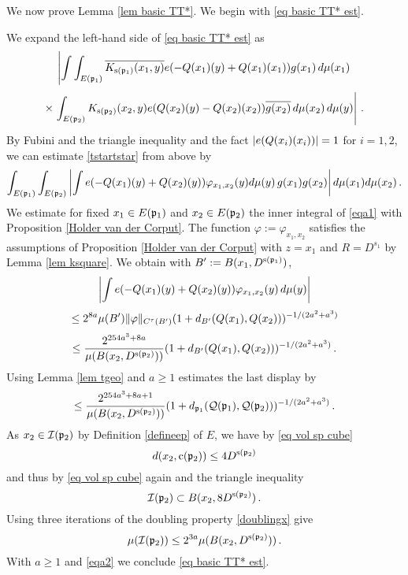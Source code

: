 {We now prove Lemma \ref{lem basic TT*}. We begin with  \eqref{eq basic TT* est}.

We expand the left-hand side of \eqref{eq basic TT* est} as
\begin{equation}\label{tstartstar}
\left|\int \int_{E(\mathfrak p_1)} \overline{K_{\mathrm{s}(\mathfrak p_1)}(x_1,y)}e(-{Q}(x_1)(y)+
    {Q}(x_1)(x_1))g(x_1)\, d\mu(x_1) \right.
\end{equation}
\begin{equation}
 \times \left.\int_{E(\mathfrak p_2)} {K_{\mathrm{s}(\mathfrak p_2)}(x_2,y)}e({Q}(x_2)(y)
    -{Q}(x_2)(x_2))\overline{g(x_2)}\, d\mu(x_2)\, d\mu(y)\right|\, .
\end{equation}
By Fubini and the triangle inequality and
the fact $|e({Q}(x_i)(x_i))|=1$ for $i=1,2$, we can estimate
\eqref{tstartstar} from above by
\begin{equation}\label{eqa1}
    \int_{E(\mathfrak p_1)} \int_{E(\mathfrak p_2)} \left|\int
    e(-{Q}(x_1)(y)+{Q}(x_2)(y))\varphi_{x_1,x_2}(y)
    d\mu(y) \, g(x_1)g(x_2)\right| d\mu(x_1)d\mu(x_2)\,.
\end{equation}
We estimate for fixed $x_1\in E(\mathfrak p_1)$ and
$x_2\in E(\mathfrak p_2)$ the inner integral of \eqref{eqa1} with
Proposition \ref{Holder van der Corput}. The function
$\varphi:=\varphi_{x_1,x_2}$ satisfies the assumptions of
Proposition \ref{Holder van der Corput} with $z = x_1$ and $R = D^{s_1}$ by Lemma \ref{lem ksquare}.
We obtain with $B':= B(x_1, D^{\mathrm{s}(\mathfrak p_1)})$,
\begin{equation}
    \left|\int
    e(-{Q}(x_1)(y)+{Q}(x_2)(y))\varphi_{x_1,x_2}(y)
    \,d\mu(y)\right|
\end{equation}
\begin{equation}
 \le     2^{8a} \mu(B') \|{\varphi}\|_{C^\tau(B')}
       (1 + d_{B'}({Q}(x_1),{Q}(x_2)))^{-1/(2a^2+a^3)}
\end{equation}
\begin{equation}
 \le     \frac{2^{254a^3+8a}}
 {\mu(B(x_2, D^{\mathrm{s}(\mathfrak p_2)}))}
       (1 + d_{B'}({Q}(x_1),{Q}(x_2)))^{-1/(2a^2+a^3)}\,.
\end{equation}
Using Lemma \ref{lem tgeo} and $a\ge 1$ estimates the last display by
\begin{equation}\label{eqa2}
 \le     \frac{2^{254a^3 + 8a + 1}}
 {\mu(B(x_2, D^{\mathrm{s}(\mathfrak p_2)}))}
       (1+d_{\mathfrak p_1}(\mathcal{Q}(\mathfrak p_1), \mathcal{Q}(\mathfrak p_2)))^{-1/(2a^2+a^3)}\,.
\end{equation}
As $x_2\in \mathcal{I}(\mathfrak p_2)$ by Definition \eqref{defineep} of $E$, we have by \eqref{eq vol sp cube}
\begin{equation}
    d(x_2,\mathrm{c}(\mathfrak p_2))\le 4D^{\mathrm{s}(\mathfrak p_2)}
\end{equation}
and thus by \eqref{eq vol sp cube} again and the triangle inequality
\begin{equation}
    \mathcal{I}(\mathfrak p_2)\subset B(x_2,8D^{\mathrm{s}(\mathfrak p_2)})\, .
\end{equation}
Using three iterations of the doubling property \eqref{doublingx} give
\begin{equation}
    \mu(\mathcal{I}(\mathfrak p_2))\le 2^{3a}\mu(B(x_2,D^{\mathrm{s}(\mathfrak p_2)}))\, .
\end{equation}
With $a\ge 1$ and \eqref{eqa2} we conclude \eqref{eq basic TT* est}.


}
